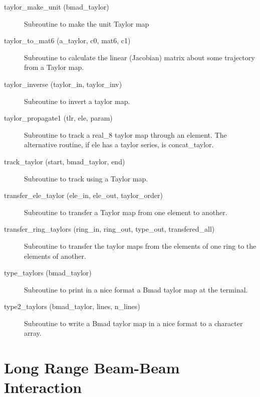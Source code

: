 \begin{description}
\item[taylor\_make\_unit (bmad\_taylor)] \Newline
Subroutine to make the unit Taylor map

\item[taylor\_to\_mat6 (a\_taylor, c0, mat6, c1)] \Newline
Subroutine to calculate the linear (Jacobian) matrix about some
trajectory from a Taylor map.

\item[taylor\_inverse (taylor\_in, taylor\_inv)] \Newline
Subroutine to invert a taylor map. 

\item[taylor\_propagate1 (tlr, ele, param)] \Newline
Subroutine to track a real\_8 taylor map through an element. 
The alternative routine, if ele has a taylor series, is concat\_taylor. 

\item[track\_taylor (start, bmad\_taylor, end)] \Newline
Subroutine to track using a Taylor map. 

\item[transfer\_ele\_taylor (ele\_in, ele\_out, taylor\_order)] \Newline 
Subroutine to transfer a Taylor map from one element to another.

\item[transfer\_ring\_taylors (ring\_in, ring\_out, 
                                             type\_out, transfered\_all) ] \Newline 
Subroutine to transfer the taylor maps from the elements of one ring to
the elements of another. 

\item[type\_taylors (bmad\_taylor)] \Newline
Subroutine to print in a nice format a Bmad taylor map at the terminal. 

\item[type2\_taylors (bmad\_taylor, lines, n\_lines)] \Newline
Subroutine to write a Bmad taylor map in a nice format to a character array. 

\end{description}

\section{Long Range Beam-Beam Interaction}
\label{r:lrbbi}    

